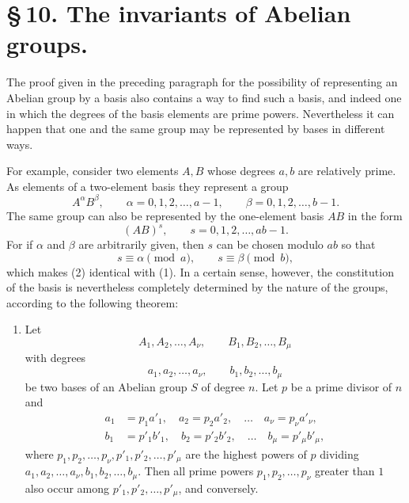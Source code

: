 \documentclass[11pt]{article}
\begin{document}
\section*{\S\,10. The invariants of Abelian groups.}

The proof given in the preceding paragraph for the possibility of representing an Abelian group by a basis also contains a way to find such a basis, and indeed one in which the degrees of the basis elements are prime powers. Nevertheless it can happen that one and the same group may be represented by bases in different ways.

For example, consider two elements $A,B$ whose degrees $a,b$ are relatively prime. As elements of a two-element basis they represent a group
\begin{equation}
A^\alpha B^\beta,
\qquad
\alpha=0,1,2,\ldots,a-1,
\qquad
\beta=0,1,2,\ldots,b-1.
\tag{1}
\end{equation}
The same group can also be represented by the one-element basis $AB$ in the form
\begin{equation}
(AB)^s,
\qquad
s=0,1,2,\ldots,ab-1.
\tag{2}
\end{equation}
For if $\alpha$ and $\beta$ are arbitrarily given, then $s$ can be chosen modulo $ab$ so that
\[
s\equiv\alpha\pmod a,
\qquad
s\equiv\beta\pmod b,
\]
which makes (2) identical with (1). In a certain sense, however, the constitution of the basis is nevertheless completely determined by the nature of the groups, according to the following theorem:

\begin{enumerate}[label=\Roman*.,start=2]
\item Let
\[
A_1,A_2,\ldots,A_\nu,
\qquad
B_1,B_2,\ldots,B_\mu
\]
with degrees
\[
a_1,a_2,\ldots,a_\nu,
\qquad
b_1,b_2,\ldots,b_\mu
\]
be two bases of an Abelian group $S$ of degree $n$. Let $p$ be a prime divisor of $n$ and
\begin{align}
a_1&=p_1a'_1,\quad a_2=p_2a'_2,
\quad\ldots\quad
 a_\nu=p_\nu a'_\nu,
\tag{1}\\
b_1&=p'_1b'_1,
\quad b_2=p'_2b'_2,
\quad\ldots\quad
 b_\mu=p'_\mu b'_\mu,
\tag{2}
\end{align}
where $p_1,p_2,
\ldots,p_\nu,p'_1,p'_2,
\ldots,p'_\mu$ are the highest powers of $p$ dividing $a_1,a_2,
\ldots,a_\nu,b_1,b_2,
\ldots,b_\mu$. Then all prime powers $p_1,p_2,
\ldots,p_\nu$ greater than $1$ also occur among $p'_1,p'_2,
\ldots,p'_\mu$, and conversely.
\end{enumerate}
\end{document}
